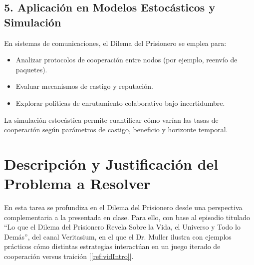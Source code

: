 \documentclass{article}
\begin{document}
\subsection{5. Aplicación en Modelos Estocásticos y Simulación}
En sistemas de comunicaciones, el Dilema del Prisionero se emplea para:

\begin{itemize}
  \item Analizar protocolos de cooperación entre nodos (por ejemplo, reenvío de paquetes).
  \item Evaluar mecanismos de castigo y reputación.
  \item Explorar políticas de enrutamiento colaborativo bajo incertidumbre.
\end{itemize}

La simulación estocástica permite cuantificar cómo varían las tasas de cooperación 
según parámetros de castigo, beneficio y horizonte temporal.


\section{Descripción y Justificación del Problema a Resolver}\label{sec:descr}

En esta tarea se profundiza en el Dilema del Prisionero desde una perspectiva complementaria a 
la presentada en clase. Para ello, con base al episodio titulado “Lo que el Dilema del 
Prisionero Revela Sobre la Vida, el Universo y Todo lo Demás”, del canal Veritasium, en el 
que el Dr. Muller ilustra con ejemplos prácticos cómo distintas estrategias interactúan en 
un juego iterado de cooperación versus traición [\ref{ref:vidIntro}].
\end{document}
